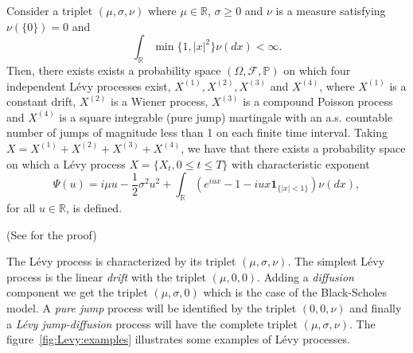 \begin{thm}
Consider a triplet $(\mu,\sigma,\nu)$ where $\mu\in\mathbb{R}$, $\sigma\geq 0$ and $\nu$ is a measure satisfying $\nu(\{0\}) = 0$ and
$$\int_\mathbb{R} \min\{1,|x|^2\}\nu(dx)<\infty.$$
Then, there exists exists a probability space $(\Omega,\mathcal{F},\mathbb{P})$ on which four independent L\'evy processes exist, $X^{(1)},X^{(2)},X^{(3)}$ and $X^{(4)}$, where $X^{(1)}$ is a constant drift, $X^{(2)}$ is a Wiener process, $X^{(3)}$ is a compound Poisson process and $X^{(4)}$ is a square integrable (pure jump) martingale with an a.s. countable number of jumps of magnitude less than 1 on each finite time interval. Taking $X = X^{(1)}+X^{(2)}+X^{(3)}+X^{(4)}$, we have that there exists a probability space on which a L\'evy process $X = \{X_t,0\leq t \leq T\}$ with characteristic exponent
$$\Psi(u) = i\mu u -\frac{1}{2}\sigma^2u^2+\int_\mathbb{R}\left(e^{iux}-1-iux\mathbf{1}_{\{|x|<1\}}\right)\nu(dx),$$
for all $u\in\mathbb{R}$, is defined.

(See \citeauthor{Kyp06} \citeyearpar{Kyp06} for the proof)
\end{thm}

The L\'evy process is characterized by its triplet $(\mu,\sigma,\nu)$. The simplest L\'evy process is the linear \textit{drift} with the triplet $(\mu,0,0)$. Adding a \textit{diffusion} component we get the triplet $(\mu,\sigma,0)$ which is the case of the Black-Scholes model. A \textit{pure jump} process will be identified by the triplet $(0,0,\nu)$ and finally a \textit{L\'evy jump-diffusion} process will have the complete triplet $(\mu,\sigma,\nu)$. The figure~\ref{fig:Levy:examples} illustrates some examples of L\'evy processes.

